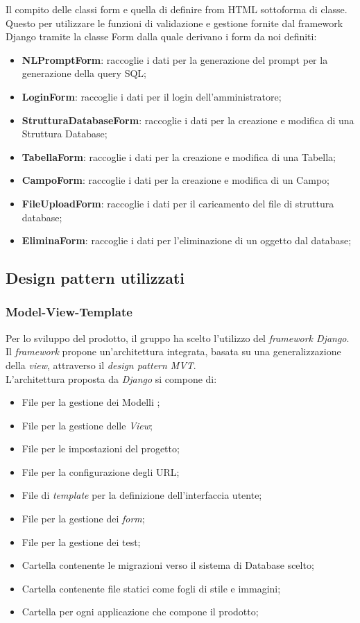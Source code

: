 \documentclass[5pt]{article}
\begin{document}
	Il compito delle classi form e quella di definire from HTML sottoforma di classe. Questo per utilizzare le funzioni di validazione e gestione fornite dal framework Django tramite la classe Form dalla quale derivano i form da noi definiti:
	\begin{itemize}
		\item \textbf{NLPromptForm}: raccoglie i dati per la generazione del prompt per la generazione della query SQL;
		\item \textbf{LoginForm}: raccoglie i dati per il login dell'amministratore;
		\item \textbf{StrutturaDatabaseForm}: raccoglie i dati per la creazione e modifica di una Struttura Database;
		\item \textbf{TabellaForm}: raccoglie i dati per la creazione e modifica di una Tabella;
		\item \textbf{CampoForm}: raccoglie i dati per la creazione e modifica di un Campo;
		\item \textbf{FileUploadForm}: raccoglie i dati per il caricamento del file di struttura database;
		\item \textbf{EliminaForm}: raccoglie i dati per l'eliminazione di un oggetto dal database;
	\end{itemize}
	
	\subsection{Design pattern utilizzati}
			\subsubsection{Model-View-Template}
			Per lo sviluppo del prodotto, il gruppo ha scelto l'utilizzo del \textit{framework Django}. Il \textit{framework} propone un'architettura integrata,
			basata su una generalizzazione della \textit{view}, attraverso il \textit{design pattern MVT}. \\
			L'architettura proposta da \textit{Django} si compone di:
			\begin{itemize}
			\item File per la gestione dei Modelli ;
			\item File per la gestione delle \textit{View};
			\item File per le impostazioni del progetto;
			\item File per la configurazione degli URL;
			\item File di \textit{template} per la definizione dell'interfaccia utente;
			\item File per la gestione dei \textit{form}; 
			\item File per la gestione dei test;
			\item Cartella contenente le migrazioni verso il sistema di Database scelto;
			\item Cartella contenente file statici come fogli di stile e immagini;
			\item Cartella per ogni applicazione che compone il prodotto;
			\end{itemize}
\end{document}
